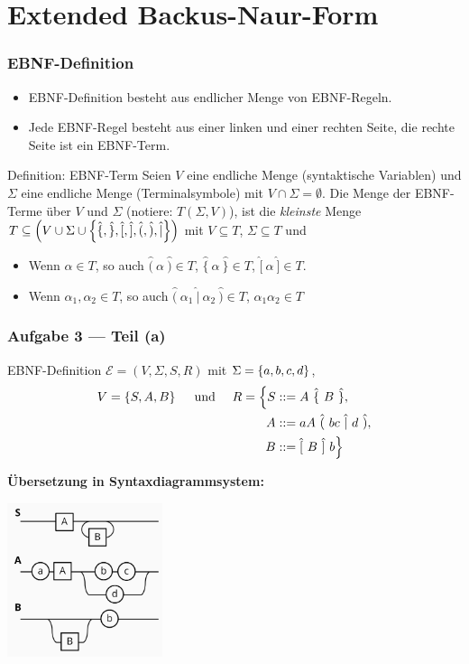 \documentclass{beamer}
\newcommand{\wdh}[1]{\hat{\{} \ #1 \ \hat{\}}}
\newcommand{\opt}[2]{\hat{(} \ #1 \ \hat{|} \ #2 \ \hat{)}}
\newcommand{\byp}[1]{\hat{[} \ #1 \ \hat{]}}
\newcommand{\rdb}[1]{\hat{(} \ #1 \ \hat{)}}
\begin{document}
\section{Extended Backus-Naur-Form}

\begin{frame} \frametitle{EBNF-Definition}
	\small
	\begin{itemize}
		\item EBNF-Definition besteht aus endlicher Menge von EBNF-Regeln.
		\item Jede EBNF-Regel besteht aus einer linken und einer rechten Seite, die rechte Seite ist ein EBNF-Term.
	\end{itemize}
	\pause
	\begin{block}{Definition: EBNF-Term}
		Seien $V$ eine endliche Menge (syntaktische Variablen) und $\Sigma$ eine endliche Menge (Terminalsymbole) mit $V \cap \Sigma = \emptyset$. Die Menge der EBNF-Terme über $V$ und $\Sigma$ (notiere: $T(\Sigma, V)$), ist die \emph{kleinste} Menge $T \subseteq \left( V \cup \Sigma \cup \left\{ \hat{\{}, \hat{\}}, \hat{[}, \hat{]}, \hat{(}, \hat{)}, \hat{|} \right\} \right)$ mit $V \subseteq T$, $\Sigma \subseteq T$ und
		\begin{itemize}
			\item Wenn $\alpha \in T$, so auch $\rdb{\alpha} \in T$, $\wdh{\alpha} \in T$, $\byp{\alpha} \in T$.
			\item Wenn $\alpha_1, \alpha_2 \in T$, so auch $\opt{\alpha_1}{\alpha_2} \in T$, $\alpha_1 \alpha_2 \in T$
		\end{itemize}
	\end{block}
\end{frame}

\begin{frame} \frametitle{Aufgabe 3 --- Teil (a)}
	\small
	EBNF-Definition $\mathcal{E} = (V,\Sigma,S,R)$ mit $\Sigma = \left\{ a,b,c,d \right\}$,
	\begin{align*}
		V = \menge{S,A,B} 
		\quad \und \quad
		R = \Big\{ S &::= A \ \wdh{B} , \\ 
				   A &::= aA \  \opt{bc}{d} , \\
				   B &::= \byp{B} \ b 
		    \Big\}
	\end{align*}

	\pause
	
	\textbf{Übersetzung in Syntaxdiagrammsystem:}
	
	\centering
	\includegraphics[height=4.5cm]{tut02_syntax_dia_3a.jpg}
\end{frame}
\end{document}
